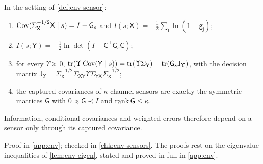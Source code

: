 \begin{lemma}\label{lem:env-information}
In the setting of \cref{def:env-sensor}:
\begin{enumerate}
\item[(i)] $\operatorname{Cov}(\Sigma_{\mathsf X}^{-1/2}\mathsf X\mid s)=I-\mathsf G_s$ and $I(s;\mathsf X)=-\frac12\sum_{\mathsf j}\ln(1-\mathsf g_{\mathsf j})$;
\item[(ii)] $I(s;\mathsf Y)=-\frac12\ln\det(I-\mathsf C^\top\mathsf G_s\mathsf C)$;
\item[(iii)] for every $\Upsilon\succeq0$, $\operatorname{tr}(\Upsilon\operatorname{Cov}(\mathsf Y\mid s))=\operatorname{tr}(\Upsilon\Sigma_{\mathsf Y})-\operatorname{tr}(\mathsf G_s\mathsf J_\Upsilon)$, with the decision matrix $\mathsf J_\Upsilon=\Sigma_{\mathsf X}^{-1/2}\Sigma_{\mathsf X\mathsf Y}\Upsilon\Sigma_{\mathsf Y\mathsf X}\Sigma_{\mathsf X}^{-1/2}$;
\item[(iv)] the captured covariances of $\kappa$-channel sensors are exactly the symmetric matrices $\mathsf G$ with $0\preceq\mathsf G\prec I$ and $\operatorname{rank}\mathsf G\le\kappa$.
\end{enumerate}
Information, conditional covariances and weighted errors therefore depend on a sensor only through its captured covariance.
\end{lemma}

Proof in \cref{app:env}; checked in \cref{chk:env-sensors}. The proofs rest on the eigenvalue inequalities of \cref{lem:env-eigen}, stated and proved in full in \cref{app:env}.

